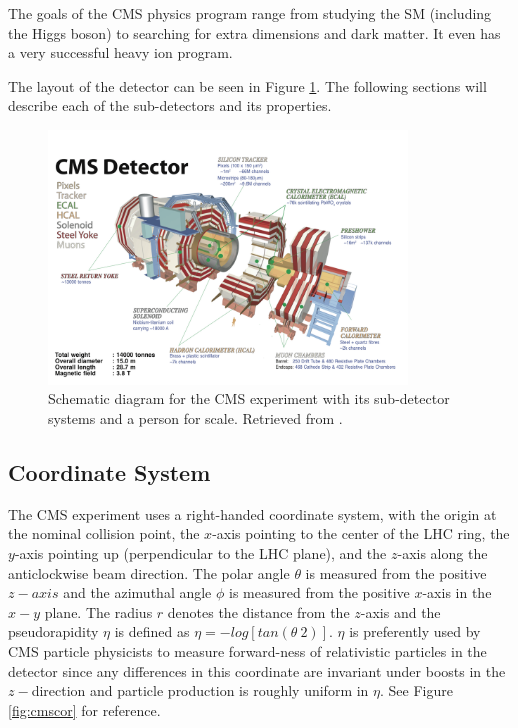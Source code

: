 The goals of the CMS physics program range from studying the SM (including the Higgs boson) to searching for extra dimensions and dark matter. It even has a very successful heavy ion program.

The layout of the detector can be seen in Figure \ref{fig:cmsdia}. The following sections will describe each of the sub-detectors and its properties.

 \begin{figure}[H]
 	\centering
 	\includegraphics[width=0.85\textwidth]{figures/cms_whole.png}
 	\singlespace
 	\caption{Schematic diagram for the CMS experiment with its sub-detector systems and a person for scale. Retrieved from \cite{CMS-schematic}.}
 	\label{fig:cmsdia}
 \end{figure}

 \subsection{Coordinate System}

 The CMS experiment uses a right-handed coordinate system, with the origin at the nominal collision point, the $x$-axis pointing to the center of the LHC ring, the $y$-axis pointing up (perpendicular to the LHC plane), and the $z$-axis along the anticlockwise beam direction. The polar angle $\theta$ is measured from the positive $z-axis$ and the azimuthal angle $\phi$ is measured from the positive $x$-axis in the $x-y$ plane. The radius $r$ denotes the distance from the $z$-axis and the pseudorapidity $\eta$ is defined as $\eta=-log[tan(\theta \ 2)]$. $\eta$ is preferently used by CMS particle physicists to measure forward-ness of relativistic particles in the detector since any differences in this coordinate are invariant under boosts in the $z-$direction and particle production is roughly uniform in $\eta$. See Figure \ref{fig:cmscor} for reference.

